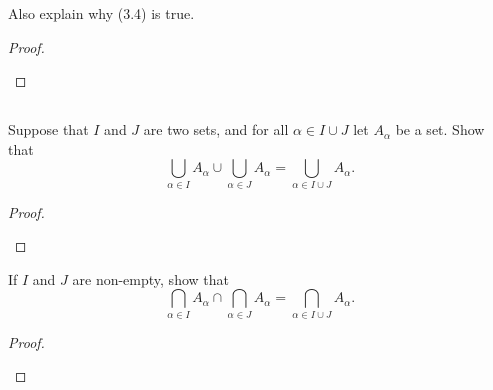 \documentclass[../../main.tex]{subfiles}
\begin{document}
\begin{q}
    Also explain why (3.4) is true.
\end{q}

\begin{proof}
    
    \begin{xx}
        
    \end{xx}
\end{proof}
    


\subsection{}
\begin{q}
    Suppose that $I$ and $J$ are two sets, and for all $\alpha \in I \cup J$ let $A_\alpha$ be a set. Show that
    \[\bigcup_{\alpha \in I} A_\alpha \cup \bigcup_{\alpha \in J} A_\alpha = \bigcup_{\alpha \in I \cup J} A_\alpha.\]
\end{q}

    \begin{proof}
    
        \begin{xx}
            
        \end{xx}
    \end{proof}

\begin{q}
    If $I$ and $J$ are non-empty, show that
    \[\bigcap_{\alpha \in I} A_\alpha \cap \bigcap_{\alpha \in J} A_\alpha = \bigcap_{\alpha \in I \cup J} A_\alpha.\]
\end{q}


\begin{proof}
    
    \begin{xx}
        
    \end{xx}
\end{proof}
\end{document}
